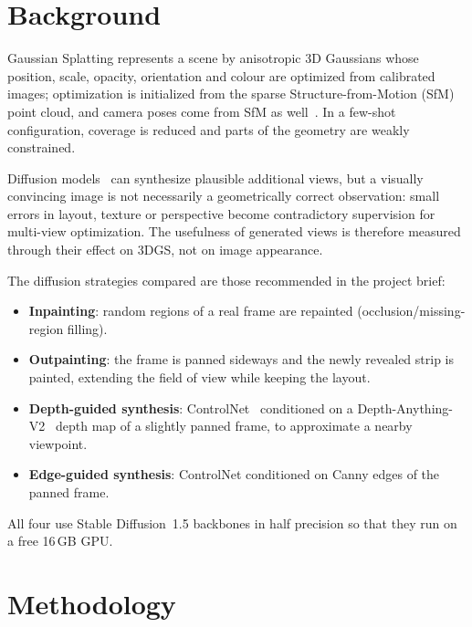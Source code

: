 \documentclass{article}
\begin{document}
\section{Background}

Gaussian Splatting represents a scene by anisotropic 3D Gaussians whose position, scale, opacity, orientation and
colour are optimized from calibrated images; optimization is initialized from the sparse Structure-from-Motion
(SfM) point cloud, and camera poses come from SfM as well~\cite{schonberger2016colmap}. In a few-shot
configuration, coverage is reduced and parts of the geometry are weakly constrained.

Diffusion models~\cite{rombach2022ldm} can synthesize plausible additional views, but a visually convincing image is not
necessarily a geometrically correct observation: small errors in layout, texture or perspective become
contradictory supervision for multi-view optimization. The usefulness of generated views is therefore measured
through their effect on 3DGS, not on image appearance.

The diffusion strategies compared are those recommended in the project brief:
\begin{itemize}[noitemsep]
  \item \textbf{Inpainting}: random regions of a real frame are repainted (occlusion/missing-region filling).
  \item \textbf{Outpainting}: the frame is panned sideways and the newly revealed strip is painted,
        extending the field of view while keeping the layout.
  \item \textbf{Depth-guided synthesis}: ControlNet~\cite{zhang2023controlnet} conditioned on a Depth-Anything-V2~\cite{yang2024depthanythingv2}
        depth map of a slightly panned frame, to approximate a nearby viewpoint.
  \item \textbf{Edge-guided synthesis}: ControlNet conditioned on Canny edges of the panned frame.
\end{itemize}
All four use Stable Diffusion~1.5 backbones in half precision so that they run on a free 16\,GB GPU.


\section{Methodology}
\end{document}
